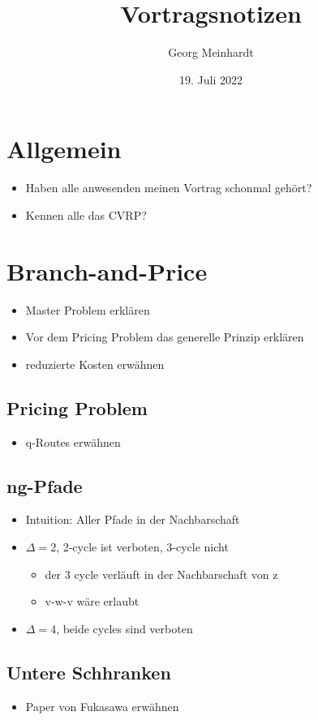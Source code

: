 \documentclass{article}
\title{Vortragsnotizen}
\author{Georg Meinhardt}
\date{19. Juli 2022}
\begin{document}
\maketitle
\section*{Allgemein}
\begin{itemize}
    \item Haben alle anwesenden meinen Vortrag schonmal gehört?
    \item Kennen alle das CVRP?
\end{itemize}

\section*{Branch-and-Price}
\begin{itemize}
    \item Master Problem erklären
    \item Vor dem Pricing Problem das generelle Prinzip erklären
    \item reduzierte Kosten erwähnen
\end{itemize}

\subsection*{Pricing Problem}
\begin{itemize}
    \item q-Routes erwähnen
\end{itemize}

\subsection*{ng-Pfade}
\begin{itemize}
    \item Intuition: Aller Pfade in der Nachbarschaft
    \item $\Delta = 2$, 2-cycle ist verboten, 3-cycle nicht
    \begin{itemize}
        \item der 3 cycle verläuft in der Nachbarschaft von z
        \item v-w-v wäre erlaubt
    \end{itemize}
    \item $\Delta = 4$, beide cycles sind verboten
\end{itemize}
\subsection*{Untere Schhranken}
\begin{itemize}
        \item Paper von Fukasawa erwähnen
\end{itemize}
\end{document}
